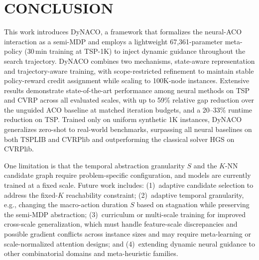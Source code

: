 \documentclass[sigconf]{acmart}
\begin{document}
\section{CONCLUSION}

This work introduces DyNACO, a framework that formalizes the neural-ACO interaction as a semi-MDP and employs a lightweight 67,361-parameter meta-policy (30\,min training at TSP-1K) to inject dynamic guidance throughout the search trajectory. DyNACO combines two mechanisms, state-aware representation and trajectory-aware training, with scope-restricted refinement to maintain stable policy-reward credit assignment while scaling to 100K-node instances. Extensive results demonstrate state-of-the-art performance among neural methods on TSP and CVRP across all evaluated scales, with up to 59\% relative gap reduction over the unguided ACO baseline at matched iteration budgets, and a 20--33\% runtime reduction on TSP. Trained only on uniform synthetic 1K instances, DyNACO generalizes zero-shot to real-world benchmarks, surpassing all neural baselines on both TSPLIB and CVRPlib and outperforming the classical solver HGS on CVRPlib.

One limitation is that the temporal abstraction granularity $S$ and the $K$-NN candidate graph require problem-specific configuration, and models are currently trained at a fixed scale.
Future work includes: (1)~adaptive candidate selection to address the fixed-$K$ reachability constraint; (2)~adaptive temporal granularity, e.g., changing the macro-action duration $S$ based on stagnation while preserving the semi-MDP abstraction; (3)~curriculum or multi-scale training for improved cross-scale generalization, which must handle feature-scale discrepancies and possible gradient conflicts across instance sizes and may require meta-learning or scale-normalized attention designs; and (4)~extending dynamic neural guidance to other combinatorial domains and meta-heuristic families.

\end{document}
